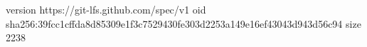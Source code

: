 version https://git-lfs.github.com/spec/v1
oid sha256:39fcc1cffda8d85309e1f3c7529430fe303d2253a149e16ef43043d943d56c94
size 2238

